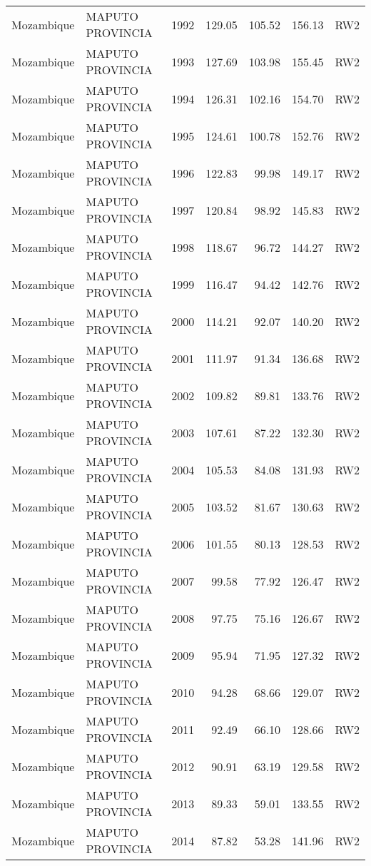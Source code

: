 \begin{longtable}{lllrrrl}
  Mozambique & MAPUTO PROVINCIA & 1992 & 129.05 & 105.52 & 156.13 & RW2 \\ 
  Mozambique & MAPUTO PROVINCIA & 1993 & 127.69 & 103.98 & 155.45 & RW2 \\ 
  Mozambique & MAPUTO PROVINCIA & 1994 & 126.31 & 102.16 & 154.70 & RW2 \\ 
  Mozambique & MAPUTO PROVINCIA & 1995 & 124.61 & 100.78 & 152.76 & RW2 \\ 
  Mozambique & MAPUTO PROVINCIA & 1996 & 122.83 & 99.98 & 149.17 & RW2 \\ 
  Mozambique & MAPUTO PROVINCIA & 1997 & 120.84 & 98.92 & 145.83 & RW2 \\ 
  Mozambique & MAPUTO PROVINCIA & 1998 & 118.67 & 96.72 & 144.27 & RW2 \\ 
  Mozambique & MAPUTO PROVINCIA & 1999 & 116.47 & 94.42 & 142.76 & RW2 \\ 
  Mozambique & MAPUTO PROVINCIA & 2000 & 114.21 & 92.07 & 140.20 & RW2 \\ 
  Mozambique & MAPUTO PROVINCIA & 2001 & 111.97 & 91.34 & 136.68 & RW2 \\ 
  Mozambique & MAPUTO PROVINCIA & 2002 & 109.82 & 89.81 & 133.76 & RW2 \\ 
  Mozambique & MAPUTO PROVINCIA & 2003 & 107.61 & 87.22 & 132.30 & RW2 \\ 
  Mozambique & MAPUTO PROVINCIA & 2004 & 105.53 & 84.08 & 131.93 & RW2 \\ 
  Mozambique & MAPUTO PROVINCIA & 2005 & 103.52 & 81.67 & 130.63 & RW2 \\ 
  Mozambique & MAPUTO PROVINCIA & 2006 & 101.55 & 80.13 & 128.53 & RW2 \\ 
  Mozambique & MAPUTO PROVINCIA & 2007 & 99.58 & 77.92 & 126.47 & RW2 \\ 
  Mozambique & MAPUTO PROVINCIA & 2008 & 97.75 & 75.16 & 126.67 & RW2 \\ 
  Mozambique & MAPUTO PROVINCIA & 2009 & 95.94 & 71.95 & 127.32 & RW2 \\ 
  Mozambique & MAPUTO PROVINCIA & 2010 & 94.28 & 68.66 & 129.07 & RW2 \\ 
  Mozambique & MAPUTO PROVINCIA & 2011 & 92.49 & 66.10 & 128.66 & RW2 \\ 
  Mozambique & MAPUTO PROVINCIA & 2012 & 90.91 & 63.19 & 129.58 & RW2 \\ 
  Mozambique & MAPUTO PROVINCIA & 2013 & 89.33 & 59.01 & 133.55 & RW2 \\ 
  Mozambique & MAPUTO PROVINCIA & 2014 & 87.82 & 53.28 & 141.96 & RW2 \\ 

\end{longtable}
